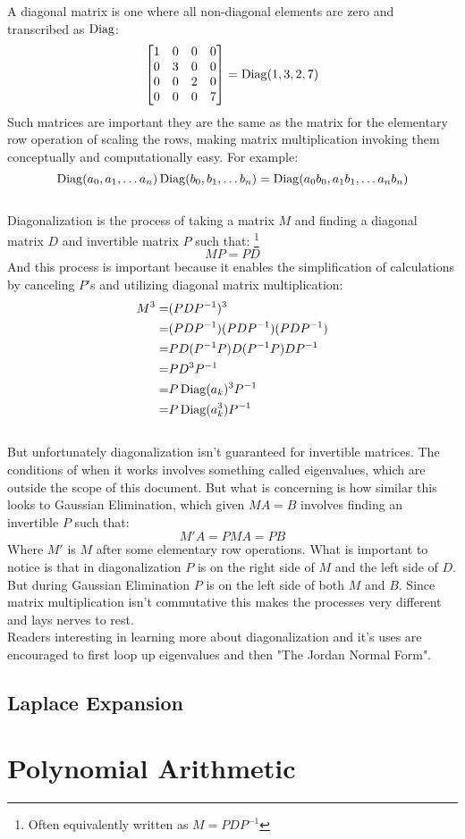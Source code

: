 A diagonal matrix is one where all non-diagonal elements are zero and transcribed as $\operatorname{Diag}$:
\[\begin{bmatrix}1&0&0&0\\0&3&0&0\\0&0&2&0\\0&0&0&7\end{bmatrix} = \operatorname{Diag}(1,3,2,7)\]
Such matrices are important they are the same as the matrix for the elementary row operation of scaling the rows,
making matrix multiplication invoking them conceptually and computationally easy.
For example:
\[\operatorname{Diag}(a_0,a_1,\dots a_n)\operatorname{Diag}(b_0,b_1,\dots b_n) = \operatorname{Diag}(a_0b_0,a_1b_1,\dots a_nb_n)\]
\\

Diagonalization is the process of taking a matrix $M$ and finding a diagonal matrix $D$ and invertible matrix $P$ such that:
\footnote{Often equivalently written as $M = PDP^{-1}$}
\[MP = PD\]
And this process is important because it enables the simplification of calculations by canceling $P$'s and utilizing diagonal matrix multiplication:
\begin{equation*}
\begin{aligned}
 M^3 =& (PDP^{-1})^3 \\
 =& (PDP^{-1})(PDP^{-1})(PDP^{-1}) \\
 =& PD(P^{-1} P)D(P^{-1} P)DP^{-1} \\
 =& PD^3P^{-1} \\
 =& P\operatorname{Diag}(a_k)^3P^{-1} \\
 =& P\operatorname{Diag}(a_k^3)P^{-1} \\
\end{aligned}
\end{equation*}
\\

But unfortunately diagonalization isn't guaranteed for invertible matrices.
The conditions of when it works involves something called eigenvalues,
which are outside the scope of this document.
But what is concerning is how similar this looks to Gaussian Elimination,
which given $MA =B$ involves finding an invertible $P$ such that:
\[M'A =PMA = PB\]
Where $M'$ is $M$ after some elementary row operations.
What is important to notice is that in diagonalization $P$ is on the right side of $M$ and the left side of $D$.
But during Gaussian Elimination $P$ is on the left side of both $M$ and $B$.
Since matrix multiplication isn't commutative this makes the processes very different and lays nerves to rest. 
\\

Readers interesting in learning more about diagonalization and it's uses are encouraged to first loop up eigenvalues and then "The Jordan Normal Form".

\subsection{Laplace Expansion}
\label{appx:laplace-expansion}

\section{Polynomial Arithmetic}
